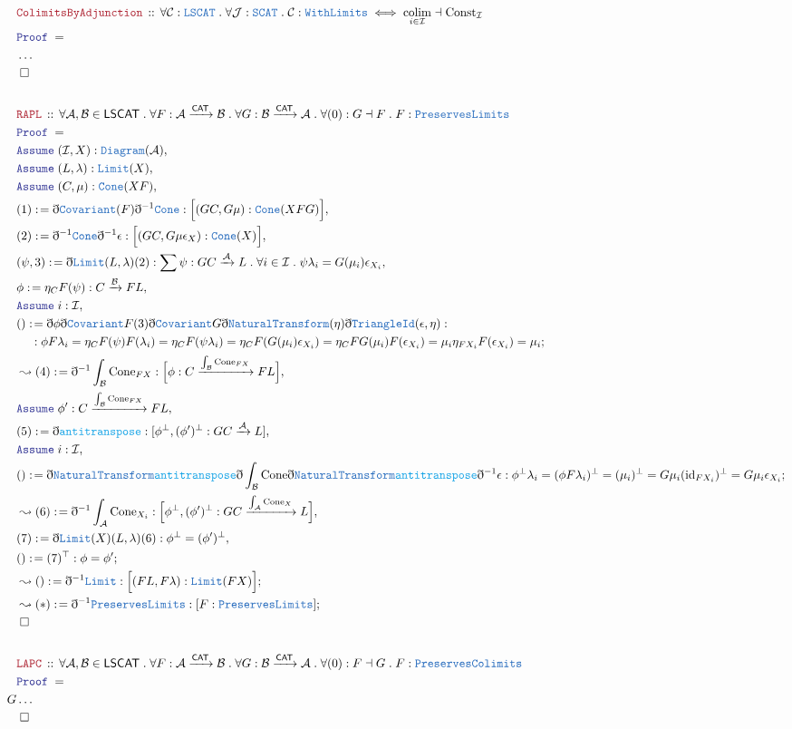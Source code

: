 \documentclass[12pt]{scrartcl}
\newcommand{\TYPE}[1]{\textcolor{NavyBlue}{\mathtt{#1}}}
\newcommand{\FUNC}[1]{\textcolor{Cerulean}{\mathtt{#1}}}
\newcommand{\LOGIC}[1]{\textcolor{Blue}{\mathtt{#1}}}
\newcommand{\THM}[1]{\textcolor{Maroon}{\mathtt{#1}}}
\renewcommand{\.}{\; . \;}
\newcommand{\de}{: \kern 0.1pc =}
\newcommand{\Theorem}[2]{& \THM{#1} \, :: \, #2 \\ & \Proof = \\ }
\newcommand{\NewLine}{\\ & \kern 1pc}
\newcommand{\Page}[1]{ \begin{align*} #1 \end{align*}   }
\newcommand{ \bd }{ \ByDef }
\newcommand{\NoProof}{ & \ldots \\ \EndProof}
\DeclareMathOperator*{\id}{id}
\newcommand{\Arrow}{\xrightarrow}
\newcommand{\Say}[3]{& #1 \de #2 : #3, \\}
\newcommand{\Conclude}[3]{& #1 \de #2 : #3; \\}
\newcommand{\Derive}[3]{& \leadsto #1 \de #2 : #3, \\}
\newcommand{\DeriveConclude}[3]{& \leadsto #1 \de #2 : #3 ; \\}
\newcommand{\Assume}[2]{& \LOGIC{Assume} \; #1 : #2, \\}
\newcommand{\QED}{\; \square}
\newcommand{\EndProof}{& \QED \\}
\newcommand{\ByDef}{\eth}
\newcommand{\Proof}{\LOGIC{Proof} \; }
\newcommand{\Cov}{\TYPE{Covariant}}
\newcommand{\NT}{\TYPE{NaturalTransform}}
\DeclareMathOperator*{\colim}{colim}
\newcommand{\C}{\mathcal{C}}
\newcommand{\A}{\mathcal{A}}
\newcommand{\B}{\mathcal{B}}
\newcommand{\I}{\mathcal{I}}
\newcommand{\J}{\mathcal{J}}
\newcommand{\CAT}{\mathsf{CAT}}
\begin{document}
\Page{
	\Theorem{ColimitsByAdjunction}{  
		\forall \C : \TYPE{LSCAT} \. 
		\forall \J : \TYPE{SCAT} \.                
		\C : \TYPE{WithLimits} \iff 
		\colim_{i \in \I} \dashv \mathrm{Const}_\I 
	}
	\NoProof
	\\
	\Theorem{RAPL}{   
		\forall \A,\B \in \mathsf{LSCAT} \. 
		\forall F : \A \Arrow{\CAT} \B \. 
		\forall G : \B \Arrow{\CAT} \A \. 
		\forall (0) :  G \dashv F \.
		F : \TYPE{PreservesLimits}
	}
	\Assume{(\I,X)}{\TYPE{Diagram}(\A)}
	\Assume{ (L,\lambda)   }{ \TYPE{Limit}(X) }
	\Assume{(C,\mu)}{\TYPE{Cone}(XF)} 
	\Say{(1)}{\bd \Cov(F) \bd^{-1} \TYPE{Cone}}{\Big[(GC,G\mu) : \TYPE{Cone}(XFG)\Big]}
	\Say{(2)}{ \bd^{-1} \TYPE{Cone} \bd^{-1} \epsilon }{  \Big[  (GC,G\mu\epsilon_{X}) : \TYPE{Cone}(X) \Big]   }
	\Say{(\psi,3)}{  \bd \TYPE{Limit}(L,\lambda)(2) }{
		\sum \psi : GC \Arrow{\A} L \. \forall i \in \I \.  \psi \lambda_i = G(\mu_i)\epsilon_{X_i}
	}
	\Say{ \phi}{   \eta_{C} F(\psi)   }{  C \Arrow{\B} FL  } 
	\Assume{i}{\I}
	\Conclude{()}{ \bd \phi \bd \Cov F (3) \bd \Cov G  \bd \NT(\eta) \bd \TYPE{TriangleId}(\epsilon, \eta) }
	{   
		\NewLine : 
		\phi F\lambda_i =  
		\eta_{C}  F(\psi)F(\lambda_i) =
		\eta_{C} F( \psi \lambda_i  ) = 
		\eta_{C} F(  G(\mu_i) \epsilon_{X_i} ) =
		\eta_{C} FG(\mu_i) F(\epsilon_{X_i}) =
		\mu_i \eta_{FX_i} F(\epsilon_{X_i}) = 
		\mu_i 
	}
	\Derive{  (4)  }{\bd^{-1} \int_{\B} \mathrm{Cone}_{FX}}{ \Big[ \phi : C \Arrow{\int_{\B} \mathrm{Cone}_{FX}} FL  \Big]  }
	\Assume{\phi'}{  C \Arrow{\int_{\B} \mathrm{Cone}_{FX}} FL  }
	\Say{(5)}{\bd \FUNC{antitranspose}}{  [\phi^\bot, (\phi')^\bot  : GC \Arrow{\A} L  ]  }
	\Assume{i}{\I}
	\Conclude{()}{  \bd \NT \FUNC{antitranspose} \bd \int_{\B} \mathrm {Cone} \bd \NT \FUNC{antitranspose} \bd^{-1} \epsilon }{ 
			\phi^\bot \lambda_i   =  
			(\phi F\lambda_i)^\bot =  
			(\mu_i)^\bot =
			G\mu_i({\id}_{FX_i})^{\bot} =
			G\mu_i\epsilon_{X_i}
		    }
	\Derive{(6)}{ \bd^{-1} \int_{\A} \mathrm{Cone}_{X_i} }
	{ \Big[\phi^\bot,(\phi')^\bot : GC \Arrow{\int_{\A} \mathrm{Cone}_{X}} L  \Big]  }
	\Say{(7)}{\bd \TYPE{Limit}(X)(L,\lambda)(6)}{ \phi^\bot = (\phi')^\bot  }
	\Conclude{()}{(7)^\top}{ \phi = \phi' }
	\DeriveConclude{()}{\bd^{-1} \TYPE{Limit}}{ \Big[  (FL,F\lambda) :  \TYPE{Limit}( FX  )  \Big]}
	\DeriveConclude{(*)}{\bd^{-1} \TYPE{PreservesLimits}}{ [F : \TYPE{PreservesLimits} ] }
	\EndProof
	\\
	\Theorem{LAPC}{      
		\forall \A,\B \in \mathsf{LSCAT} \.
		\forall F : \A \Arrow{\CAT} \B \. 
		\forall G : \B \Arrow{\CAT} \A \. 
		\forall (0)  : F \dashv G \.
		F : \TYPE{PreservesColimits}                                       
	}G
	\NoProof 
}
\newpage
\end{document}
